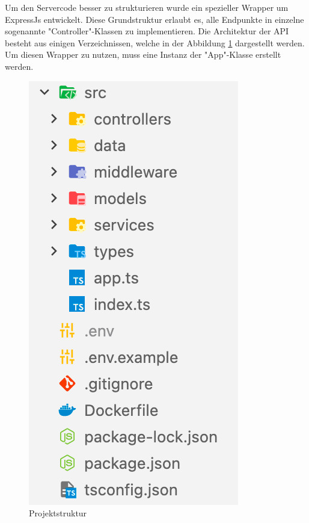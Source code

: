 
Um den Servercode besser zu strukturieren wurde ein spezieller Wrapper um ExpressJs entwickelt. 
Diese Grundstruktur erlaubt es, alle Endpunkte in einzelne sogenannte "Controller"-Klassen zu implementieren. 
Die Architektur der API besteht aus einigen Verzeichnissen, welche in der Abbildung \ref{fig:apiStructure} dargestellt werden. 
Um diesen Wrapper zu nutzen, muss eine Instanz der "App"-Klasse erstellt werden.

\begin{figure}[H]
    \centering
    \includegraphics{media/APITemplate/ProjectStructure.png}
    \caption{Projektstruktur}
    \label{fig:apiStructure}
\end{figure}

\clearpage









